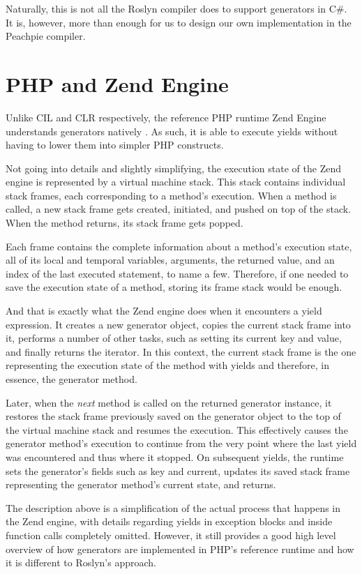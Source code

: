 Naturally, this is not all the Roslyn compiler does to support generators in C\#. It is, however, more than enough for us to design our own implementation in the Peachpie compiler. 


\section{PHP and Zend Engine}\label{ZendGen}

Unlike CIL and CLR respectively, the reference PHP runtime Zend Engine understands generators natively \citep{ZendGen}. As such, it is able to execute yields without having to lower them into simpler PHP constructs.

Not going into details and slightly simplifying, the execution state of the Zend engine is represented by a virtual machine stack. This stack contains individual stack frames, each corresponding to a method’s execution. When a method is called, a new stack frame gets created, initiated, and pushed on top of the stack. When the method returns, its stack frame gets popped.

Each frame contains the complete information about a method’s execution state, all of its local and temporal variables, arguments, the returned value, and an index of the last executed statement, to name a few. Therefore, if one needed to save the execution state of a method, storing its frame stack would be enough.

And that is exactly what the Zend engine does when it encounters a yield expression. It creates a new generator object, copies the current stack frame into it, performs a number of other tasks, such as setting its current key and value, and finally returns the iterator. In this context, the current stack frame is the one representing the execution state of the method with yields and therefore, in essence, the generator method.

Later, when the \emph{next} method is called on the returned generator instance, it restores the stack frame previously saved on the generator object to the top of the virtual machine stack and resumes the execution. This effectively causes the generator method’s execution to continue from the very point where the last yield was encountered and thus where it stopped. On subsequent yields, the runtime sets the generator’s fields such as key and current, updates its saved stack frame representing the generator method's current state, and returns.

The description above is a simplification of the actual process that happens in the Zend engine, with details regarding yields in exception blocks and inside function calls completely omitted. However, it still provides a good high level overview of how generators are implemented in PHP’s reference runtime and how it is different to Roslyn’s approach.  
